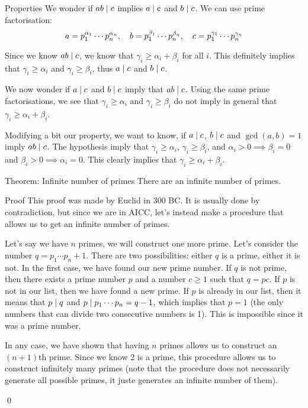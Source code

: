 \documentclass[a4paper]{article}
\begin{document}
\begin{parag}{Properties}
    We wonder if $ab \mid c$ implies $a \mid c$ and $b \mid c$. We can use prime factorisation: 
    \[a = p_1^{\alpha_1} \cdots p_n^{\alpha_n}, \quad b = p_1^{\beta_1} \cdots p_n^{\beta_n}, \quad c = p_1^{\gamma_1} \cdots p_n^{\gamma_n}\]
    
    Since we know $ab \mid c$, we know that $\gamma_i \geq \alpha_i + \beta_i$ for all $i$. This definitely implies that $\gamma_i \geq \alpha_i$ and $\gamma_i \geq \beta_i$, thus $a \mid c$ and $b \mid c$.

    \vspace{1em}

    We now wonder if $a \mid c$ and $b \mid c$ imply that $ab \mid c$. Using the same prime factorisations, we see that $\gamma_i \geq \alpha_i$ and $\gamma_i \geq \beta_i$ do not imply in general that $\gamma_i \geq \alpha_i + \beta_i$. 

    Modifying a bit our property, we want to know, if $a \mid c$, $b \mid c$ and $\gcd\left(a, b\right) = 1$ imply $ab \mid c$.\label{ref:divisibilityPropertiesForChineseRemaindersTheorem} The hypothesis imply that $\gamma_i \geq \alpha_i$, $\gamma_i \geq \beta_i$, and $\alpha_i > 0 \implies \beta_i = 0$ and $\beta_i > 0 \implies \alpha_i = 0$. This clearly implies that $\gamma_i \geq \alpha_i + \beta_i$.
\end{parag}

\begin{parag}{Theorem: Infinite number of primes}
    There are an infinite number of primes.

    \begin{subparag}{Proof}
        This proof was made by Euclid in 300 BC. It is usually done by contradiction, but since we are in AICC, let's instead make a procedure that allows us to get an infinite number of primes.
    
        Let's say we have $n$ primes, we will construct one more prime. Let's consider the number $q = p_1 \cdots p_n + 1$. There are two possibilities: either $q$ is a prime, either it is not. In the first case, we have found our new prime number. If $q$ is not prime, then there exists a prime number $p$ and a number $c \geq 1$ such that $q = pc$. If $p$ is not in our list, then we have found a new prime. If $p$ is already in our list, then it means that $p \mid q$ and $p \mid p_1 \cdots p_n = q - 1$, which implies that $p = 1$ (the only numbers that can divide two consecutive numbers is 1). This is impossible since it was a prime number. 

        In any case, we have shown that having $n$ primes allows us to construct an $\left(n+1\right)$th prime. Since we know 2 is a prime, this procedure allows us to construct infinitely many primes (note that the procedure does not necessarily generate all possible primes, it juste generates an infinite number of them).
        
        \qed
    \end{subparag}
    
\end{parag}
\end{document}
